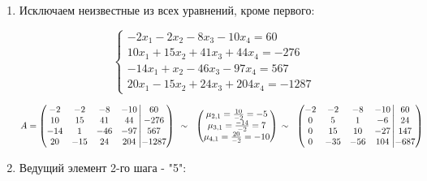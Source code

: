\documentclass[a4paper,12pt]{article} %
\begin{document}
\begin{enumerate}

\item Исключаем неизвестные из всех уравнений, кроме первого:

\begin{equation*}
    \begin{cases}
    -2x_1 - 2x_2 - 8x_3 - 10x_4 = 60\\
    10x_1 + 15x_2 + 41x_3 + 44x_4 = -276\\
    -14x_1 + x_2 - 46x_3 - 97x_4 = 567\\
    20x_1 - 15x_2 + 24x_3 + 204x_4 = -1287
    \end{cases}
\end{equation*}

$
A = \left(\begin{matrix} 
-2 & -2 & -8 & -10\\ 
10 & 15 & 41 & 44\\ 
-14 & 1 & -46 & -97\\
20 & -15 & 24 & 204 
\end{matrix}\left| 
\begin{matrix} 
60 \\ -276 \\ 567 \\ -1287 
\end{matrix}\right)\right.\ 
\sim~\ 
\begin{pmatrix} 
\mu_{2,1} = \frac{10}{-2} = -5\\ 
\mu_{3,1} = \frac{-14}{-2} = 7 \\ 
\mu_{4,1} = \frac{20}{-2} = -10
\end{pmatrix} \\
\sim~\ 
\left(\begin{matrix} 
-2 & -2 & -8 & -10\\ 
0 & 5 & 1 & -6\\ 
0 & 15 & 10 & -27\\
0 & -35 & -56 & 104 
\end{matrix}\left| 
\begin{matrix} 
60 \\ 24 \\ 147 \\ -687 
\end{matrix}\right)\right.\ 
$


\item Ведущий элемент 2-го шага - "5":


\end{enumerate}
\end{document}
